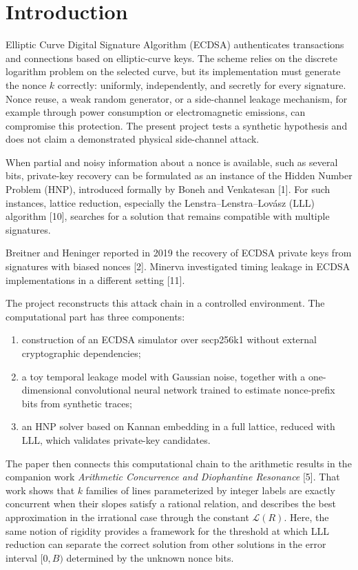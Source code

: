 \documentclass[11pt,a4paper]{article}
\begin{document}
\clearpage
\tableofcontents
\clearpage

\section{Introduction}

Elliptic Curve Digital Signature Algorithm (ECDSA) authenticates transactions and connections based on elliptic-curve keys. The scheme relies on the discrete logarithm problem on the selected curve, but its implementation must generate the nonce $k$ correctly: uniformly, independently, and secretly for every signature. Nonce reuse, a weak random generator, or a side-channel leakage mechanism, for example through power consumption or electromagnetic emissions, can compromise this protection. The present project tests a synthetic hypothesis and does not claim a demonstrated physical side-channel attack.

When partial and noisy information about a nonce is available, such as several bits, private-key recovery can be formulated as an instance of the Hidden Number Problem (HNP), introduced formally by Boneh and Venkatesan [1]. For such instances, lattice reduction, especially the Lenstra--Lenstra--Lovász (LLL) algorithm [10], searches for a solution that remains compatible with multiple signatures.

Breitner and Heninger reported in 2019 the recovery of ECDSA private keys from signatures with biased nonces [2]. Minerva investigated timing leakage in ECDSA implementations in a different setting [11].

The project reconstructs this attack chain in a controlled environment. The computational part has three components:
\begin{enumerate}[label=(\roman*),leftmargin=2.5em]
\item construction of an ECDSA simulator over secp256k1 without external cryptographic dependencies;
\item a toy temporal leakage model with Gaussian noise, together with a one-dimensional convolutional neural network trained to estimate nonce-prefix bits from synthetic traces;
\item an HNP solver based on Kannan embedding in a full lattice, reduced with LLL, which validates private-key candidates.
\end{enumerate}

The paper then connects this computational chain to the arithmetic results in the companion work \emph{Arithmetic Concurrence and Diophantine Resonance} [5]. That work shows that $k$ families of lines parameterized by integer labels are exactly concurrent when their slopes satisfy a rational relation, and describes the best approximation in the irrational case through the constant $\mathcal L(R)$. Here, the same notion of rigidity provides a framework for the threshold at which LLL reduction can separate the correct solution from other solutions in the error interval $[0,B)$ determined by the unknown nonce bits.
\end{document}
